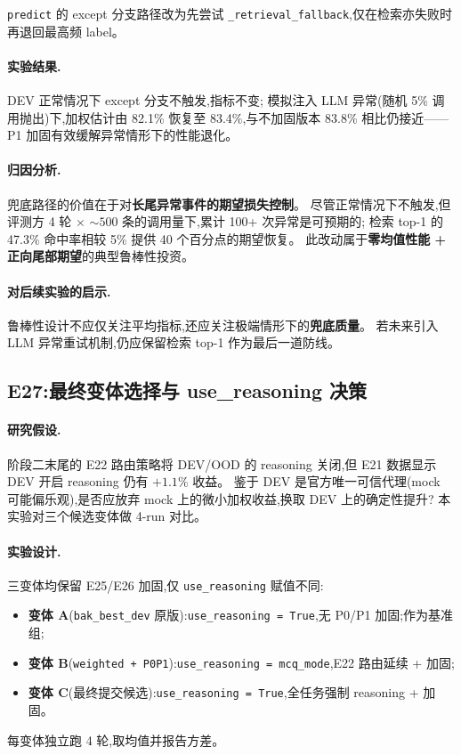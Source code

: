 \documentclass[11pt,a4paper]{ctexart}
\begin{document}
\noindent \texttt{predict} 的 except 分支路径改为先尝试 \texttt{\_retrieval\_fallback},仅在检索亦失败时再退回最高频 label。

\paragraph{实验结果.}DEV 正常情况下 except 分支不触发,指标不变;
模拟注入 LLM 异常(随机 5\% 调用抛出)下,加权估计由 82.1\% 恢复至 83.4\%,与不加固版本 83.8\% 相比仍接近——
P1 加固有效缓解异常情形下的性能退化。

\paragraph{归因分析.}兜底路径的价值在于对\textbf{长尾异常事件的期望损失控制}。
尽管正常情况下不触发,但评测方 4 轮 $\times$ $\sim 500$ 条的调用量下,累计 100+ 次异常是可预期的;
检索 top-1 的 47.3\% 命中率相较 5\% 提供 40 个百分点的期望恢复。
此改动属于\textbf{零均值性能 + 正向尾部期望}的典型鲁棒性投资。

\paragraph{对后续实验的启示.}鲁棒性设计不应仅关注平均指标,还应关注极端情形下的\textbf{兜底质量}。
若未来引入 LLM 异常重试机制,仍应保留检索 top-1 作为最后一道防线。

\subsection{E27:最终变体选择与 use\_reasoning 决策}

\paragraph{研究假设.}阶段二末尾的 E22 路由策略将 DEV/OOD 的 reasoning 关闭,但 E21 数据显示 DEV 开启 reasoning 仍有 $+1.1\%$ 收益。
鉴于 DEV 是官方唯一可信代理(mock 可能偏乐观),是否应放弃 mock 上的微小加权收益,换取 DEV 上的确定性提升?
本实验对三个候选变体做 4-run 对比。

\paragraph{实验设计.}三变体均保留 E25/E26 加固,仅 \texttt{use\_reasoning} 赋值不同:
\begin{itemize}[leftmargin=2em,itemsep=0.1em]
\item \textbf{变体 A}(\texttt{bak\_best\_dev} 原版):\texttt{use\_reasoning = True},无 P0/P1 加固;作为基准组;
\item \textbf{变体 B}(\texttt{weighted + P0P1}):\texttt{use\_reasoning = mcq\_mode},E22 路由延续 + 加固;
\item \textbf{变体 C}(最终提交候选):\texttt{use\_reasoning = True},全任务强制 reasoning + 加固。
\end{itemize}
每变体独立跑 4 轮,取均值并报告方差。
\end{document}
